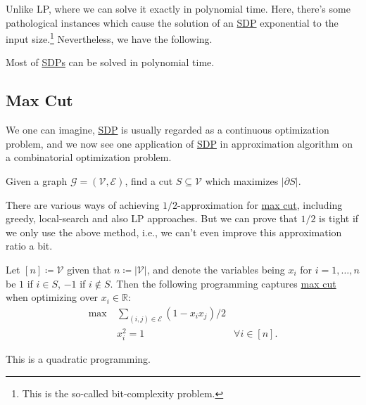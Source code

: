 Unlike LP, where we can solve it exactly in polynomial time. Here, there's some pathological instances which cause the solution of an \hyperref[def:SDP]{SDP} exponential to the input size.\footnote{This is the so-called bit-complexity problem.} Nevertheless, we have the following.

\begin{theorem}
	Most of \hyperref[def:SDP]{SDPs} can be solved in polynomial time.
\end{theorem}

\subsection{Max Cut}
We one can imagine, \hyperref[def:SDP]{SDP} is usually regarded as a continuous optimization problem, and we now see one application of \hyperref[def:SDP]{SDP} in approximation algorithm on a combinatorial optimization problem.

\begin{problem}\label{prb:max-cut}
Given a graph \(\mathcal{G} =(\mathcal{V} , \mathcal{E} )\), find a cut \(S\subseteq \mathcal{V} \) which maximizes \(\left\vert \partial S \right\vert \).
\end{problem}

\begin{remark}
	There are various ways of achieving \(1 / 2\)-approximation for \hyperref[prb:max-cut]{max cut}, including greedy, local-search and also LP approaches. But we can prove that \(1 / 2\) is tight if we only use the above method, i.e., we can't even improve this approximation ratio a bit.
\end{remark}

Let \([n] \coloneqq \mathcal{V} \) given that \(n \coloneqq \left\vert \mathcal{V}  \right\vert \), and denote the variables being \(x_i\) for \(i = 1, \dots  , n\) be \(1\) if \(i\in S\), \(-1\) if \(i \notin S\). Then the following programming captures \hyperref[prb:max-cut]{max cut} when optimizing over \(x_i\in\mathbb{R} \):
\[
	\begin{aligned}
		\max~ & \sum_{(i, j)\in \mathcal{E}} ( 1 - x_i x_j) / 2                     \\
		      & x_i ^{2} = 1                                    & \forall i\in [n].
	\end{aligned}
\]
\begin{remark}
	This is a quadratic programming.
\end{remark}

